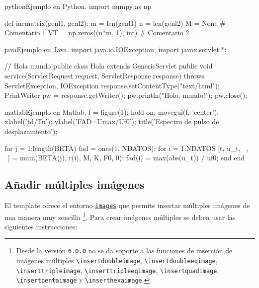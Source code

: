 \begin{sourcecode}[\label{codigo-python}]{python}{Ejemplo en Python.}
import numpy as np

def incmatrix(genl1, genl2):
	m = len(genl1)
	n = len(genl2)
	M = None # Comentario 1
	VT = np.zeros((n*m, 1), int) # Comentario 2
\end{sourcecode}

\begin{sourcecode}[\label{codigo-java}]{java}{Ejemplo en Java.}
import java.io.IOException;
import javax.servlet.*;

// Hola mundo
public class Hola extends GenericServlet {
	public void service(ServletRequest request, ServletResponse response)
	throws ServletException, IOException{
		response.setContentType("text/html");
		PrintWriter pw = response.getWriter();
		pw.println("Hola, mundo!");
		pw.close();
	}
}
\end{sourcecode}

\begin{sourcecode}[\label{codigo-matlab}]{matlab}{Ejemplo en Matlab.}
f = figure(1); hold on;
movegui(f, 'center');
xlabel('td/Tn'); ylabel('FAD=Umax/Uf0');
title('Espectro de pulso de desplazamiento');

for j = 1:length(BETA)
	fad = ones(1, NDATOS); %
	for i = 1:NDATOS
		[t, u_t, ~, ~] = main(BETA(j), r(i), M, K, F0, 0);
		fad(i) = max(abs(u_t)) / uf0;
	end
end
\end{sourcecode}

	\subsection{Añadir múltiples imágenes}

	El template ofrece el entorno \href{https://latex.ppizarror.com/informe.html#hlp-images}{\texttt{images}} que permite insertar múltiples imágenes de una manera muy sencilla \footnote{Desde la versión \texttt{6.0.0} no se da soporte a las funciones de inserción de imágenes múltiples \texttt{\textbackslash insertdoubleimage}, \texttt{\textbackslash insertdoubleeqimage}, \texttt{\textbackslash inserttripleimage}, \texttt{\textbackslash inserttripleeqimage}, \texttt{\textbackslash insertquadimage}, \texttt{\textbackslash insertpentaimage} y \texttt{\textbackslash inserthexaimage}.}. Para crear imágenes múltiples se deben usar las siguientes instrucciones:

